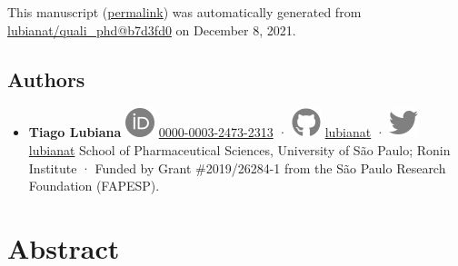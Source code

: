 This manuscript
(\href{https://lubianat.github.io/quali_phd/v/b7d3fd0aa464eb239683d617aa20c9cb1a738276/}{permalink})
was automatically generated
from \href{https://github.com/lubianat/quali_phd/tree/b7d3fd0aa464eb239683d617aa20c9cb1a738276}{lubianat/quali\_phd@b7d3fd0}
on December 8, 2021.

\hypertarget{authors}{%
\subsection{Authors}\label{authors}}

\begin{itemize}
\tightlist
\item
  \textbf{Tiago Lubiana}
  \includegraphics{images/orcid.svg}
  \href{https://orcid.org/0000-0003-2473-2313}{0000-0003-2473-2313}
  · \includegraphics{images/github.svg}
  \href{https://github.com/lubianat}{lubianat}
  · \includegraphics{images/twitter.svg}
  \href{https://twitter.com/lubianat}{lubianat}
  School of Pharmaceutical Sciences, University of São Paulo; Ronin Institute
  · Funded by Grant \#2019/26284-1 from the São Paulo Research Foundation (FAPESP).
\end{itemize}

\hypertarget{abstract}{%
\section{Abstract}\label{abstract}}

